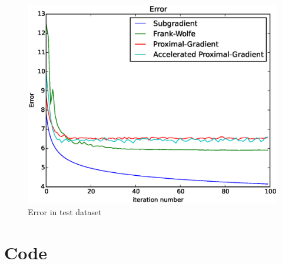 \documentclass{article}
\begin{document}
\begin{figure}[h!]
\centering
\includegraphics[scale=0.5]{error_test.eps}
\caption{Error in test dataset}
\end{figure}

\section{Code}


\end{document}

